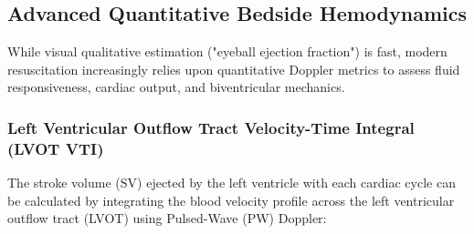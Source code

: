 \documentclass[11pt,a4paper]{article}
\begin{document}
\subsection{Advanced Quantitative Bedside Hemodynamics}
While visual qualitative estimation ("eyeball ejection fraction") is fast, modern resuscitation increasingly relies upon quantitative Doppler metrics to assess fluid responsiveness, cardiac output, and biventricular mechanics.

\subsubsection{Left Ventricular Outflow Tract Velocity-Time Integral (LVOT VTI)}
The stroke volume ($\text{SV}$) ejected by the left ventricle with each cardiac cycle can be calculated by integrating the blood velocity profile across the left ventricular outflow tract (LVOT) using Pulsed-Wave (PW) Doppler:
\end{document}
